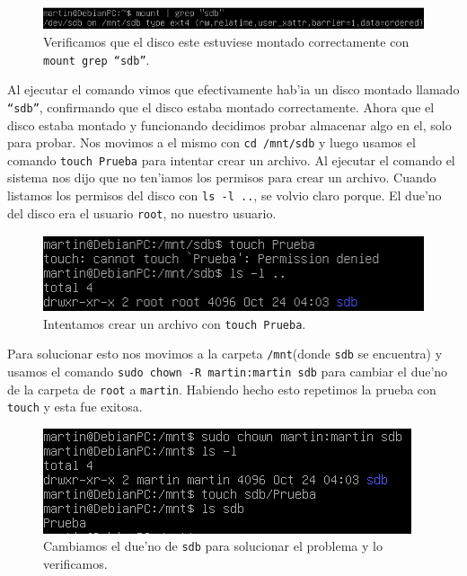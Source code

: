 \documentclass[11pt]{article}
\begin{document}
		\begin{figure}[H]
    			\centering
    			\includegraphics[scale=0.65]{Images/rsync/rsync_disk_check.PNG}
    			\caption{Verificamos que el disco este estuviese montado correctamente con \texttt{mount \textbar\/ grep ``sdb''}.}
    			\label{fig:rsync_disk_check}
		\end{figure}

		Al ejecutar el comando vimos que efectivamente hab'ia un disco montado llamado \texttt{``sdb''}, confirmando que el disco estaba montado correctamente. Ahora que el disco estaba montado y funcionando decidimos probar almacenar algo en el, solo para probar. Nos movimos a el mismo con \texttt{cd /mnt/sdb} y luego usamos el comando \texttt{touch Prueba} para intentar crear un archivo. Al ejecutar el comando el sistema nos dijo que no ten'iamos los permisos para crear un archivo. Cuando listamos los permisos del disco con \texttt{ls -l ..}, se volvio claro porque. El due'no del disco era el usuario \texttt{root}, no nuestro usuario.

		\begin{figure}[H]
    			\centering
    			\includegraphics[scale=0.75]{Images/rsync/rsync_disk_touch.PNG}
    			\caption{Intentamos crear un archivo con \texttt{touch Prueba}.}
    			\label{fig:rsync_disk_touch}
		\end{figure}

		Para solucionar esto nos movimos a la carpeta \texttt{/mnt}(donde \texttt{sdb} se encuentra) y usamos el comando \texttt{sudo chown -R martin:martin sdb} para cambiar el due'no de la carpeta de \texttt{root} a \texttt{martin}. Habiendo hecho esto repetimos la prueba con \texttt{touch} y esta fue exitosa.

		\begin{figure}[H]
    			\centering
    			\includegraphics[scale=0.75]{Images/rsync/rsync_disk_works.PNG}
    			\caption{Cambiamos el due'no de \texttt{sdb} para solucionar el problema y lo verificamos.}
    			\label{fig:rsync_disk_works}
		\end{figure}
\end{document}

